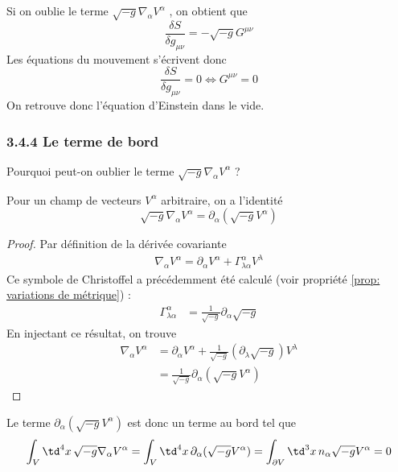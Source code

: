 Si on oublie le terme $\sqrt{-g}\nabla_{\alpha} V^{\alpha}$ , on obtient que 
\begin{equation}
    \frac{\delta S}{\delta g_{\mu \nu}} = -\sqrt{-g}G^{\mu \nu}
\end{equation}
Les équations du mouvement s'écrivent donc
\begin{equation}
    \frac{\delta S}{\delta g_{\mu \nu}} = 0 \iff G^{\mu \nu} = 0
\end{equation}
On retrouve donc l'équation d'Einstein dans le vide.

\subsubsection{3.4.4 Le terme de bord}
Pourquoi peut-on oublier le terme $\sqrt{-g}\nabla_{\alpha} V^{\alpha}$ ? 
\begin{theoremframe}
    \begin{lemme}
        Pour un champ de vecteurs $V^\alpha$ arbitraire, on a l'identité
        \begin{equation}
            \sqrt{-g}\nabla_{\alpha} V^{\alpha} = \partial_{\alpha}( \sqrt{-g}V^{\alpha})
        \end{equation}
    \end{lemme}
\end{theoremframe}
\begin{proof}
    Par définition de la dérivée covariante
    \begin{align}
       \nabla_{\alpha}V^{\alpha} = \partial_{\alpha}V^{\alpha} + \Gamma^{\alpha}_{\lambda \alpha}V^{\lambda}
    \end{align}
    Ce symbole de Christoffel a précédemment été calculé (voir propriété \ref{prop: variations de métrique}) :
    \begin{align}
        \Gamma^{\alpha}_{\lambda \alpha} &= \frac{1}{\sqrt{-    g}}\partial_{\alpha}\sqrt{-g}
    \end{align}
    En injectant ce résultat, on trouve
    \begin{align}
        \nabla_{\alpha}V^{\alpha} &= \partial_{\alpha}V^{\alpha} + \frac{1}{\sqrt{-g}}(\partial_{\lambda}\sqrt{-g})V^{\lambda}\\
        &= \frac{1}{\sqrt{-g}}\partial_{\alpha}(\sqrt{-g}V^{\alpha})
    \end{align}
\end{proof}
Le terme $\partial_{\alpha}( \sqrt{-g}V^{\alpha})$ est donc un terme au bord tel que 
\begin{equation}
    \int_{V} \td ^4x \, \sqrt{-g} \nabla_{\alpha}V^{\alpha} = \int_{V} \td ^4x \, \partial_{\alpha}( \sqrt{-g}V^{\alpha}) = \int_{\partial V} \td ^3x \, n_{\alpha}\sqrt{-g}V^{\alpha} = 0
\end{equation}
